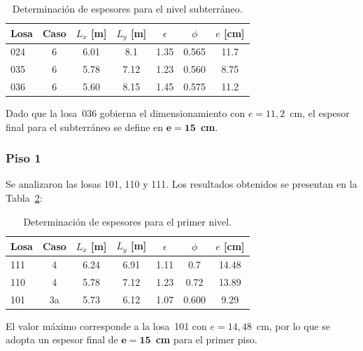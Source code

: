 \begin{table}[H]
    \centering
    \begin{tabular}{lcccccc}
        \toprule
        \textbf{Losa} & \textbf{Caso} & $L_x$ [m] & $L_y$ [m] & 
        $\epsilon$ & $\phi$ & $e$ [cm] \\
        \midrule
        024 & 6  & 6.01 & 8.1 & 1.35 & 0.565 &  11.7\\
        035 & 6  & 5.78 & 7.12 & 1.23 & 0.560 & 8.75 \\
        036 & 6 & 5.60 & 8.15 & 1.45 & 0.575 & 11.2 \\
        \bottomrule
    \end{tabular}
    \caption{Determinación de espesores para el nivel subterráneo.}
    \label{tab:esp_subt}
\end{table}

Dado que la losa~036 gobierna el dimensionamiento con $e = 11{,}2$~cm, 
el espesor final para el subterráneo se define en $\mathbf{e = 15}$~\textbf{cm}.

\subsubsection{Piso 1}

Se analizaron las losas 101, 110 y 111. Los resultados obtenidos se presentan 
en la Tabla~\ref{tab:esp_piso1}:

\begin{table}[H]
    \centering
    \begin{tabular}{lcccccc}
        \toprule
        \textbf{Losa} & \textbf{Caso} & $L_x$ [m] & $L_y$ [m] & 
        $\epsilon$ & $\phi$ & $e$ [cm] \\
        \midrule
        111 & 4  & 6.24 & 6.91 & 1.11 & 0.7 & 14.48 \\
        110 & 4  & 5.78 & 7.12 & 1.23 & 0.72 & 13.89 \\
        101 & 3a & 5.73 & 6.12 & 1.07 & 0.600 & 9.29 \\
        \bottomrule
    \end{tabular}
    \caption{Determinación de espesores para el primer nivel.}
    \label{tab:esp_piso1}
\end{table}

El valor máximo corresponde a la losa~101 con $e = 14{,}48$~cm, por lo que 
se adopta un espesor final de $\mathbf{e = 15}$~\textbf{cm} para el primer piso.

